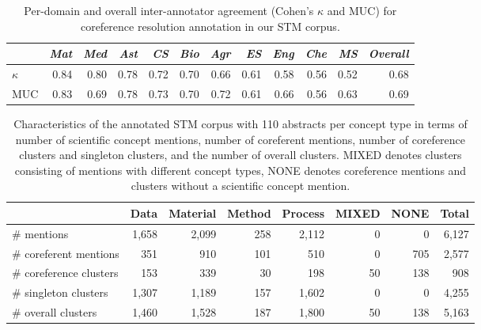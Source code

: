 \documentclass[runningheads]{llncs}
\begin{document}
\begin{table}[tb]
\centering
\small
\caption{Per-domain and overall inter-annotator agreement (Cohen's $\kappa$ and MUC) for coreference resolution annotation in our STM corpus.}
\begin{tabular}{l|rrrrrrrrrr|r}
	& \textit{Mat}	&\textit{Med}	&\textit{Ast}	&\textit{CS}	&\textit{Bio}	&\textit{Agr}	&\textit{ES}	&\textit{Eng}	&\textit{Che}	&\textit{MS} &\textit{Overall} \\ \hline
$\kappa$	& 0.84 & 0.80 & 0.78 & 0.72 & 0.70 & 0.66 & 0.61 & 0.58 & 0.56 & 0.52 & 0.68 \\ 
MUC & 0.83 & 0.69 & 0.78 & 0.73 & 0.70 & 0.72 & 0.61 & 0.66 & 0.56 & 0.63 & 0.69 \\
\end{tabular}
\label{table:ia_agreement}
\vspace{-1em}
\end{table}

\begin{table}[tb]
\centering
\small
\caption{Characteristics of the annotated STM corpus with 110 abstracts per concept type in terms of number of scientific concept mentions, number of coreferent mentions, number of coreference clusters and singleton clusters, and the number of overall clusters. MIXED denotes clusters consisting of mentions with different concept types, NONE denotes coreference mentions and clusters without a scientific concept mention.}
\label{tab:characteristics_per_concept}
\begin{tabular}{l|rrrr|rr|r}
                      & Data  & Material & Method & Process & MIXED  & NONE  & Total  \\ \hline
\# mentions            & 1,658 & 2,099 & 258 & 2,112 & 0  & 0   & 6,127 \\
\# coreferent mentions & 351  & 910  & 101 & 510  & 0  & 705 & 2,577 \\ \hline
\# coreference clusters            & 153  & 339  & 30  & 198  & 50 & 138 & 908  \\
\# singleton clusters          & 1,307 & 1,189 & 157 & 1,602 & 0  & 0   & 4,255 \\ \hline
\# overall clusters            & 1,460 & 1,528 & 187 & 1,800 & 50 & 138 & 5,163 \\ 
\end{tabular}
\end{table}
\end{document}
